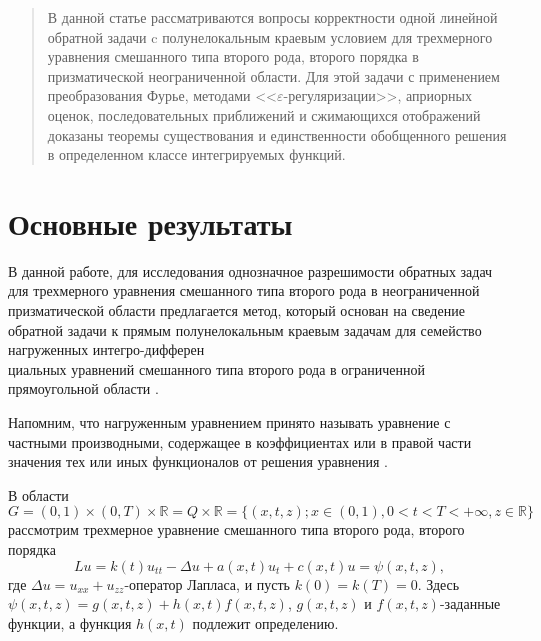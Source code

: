 \maketitle

\begin{abstract}
В данной статье рассматриваются вопросы корректности одной линейной обратной задачи c полунелокальным краевым условием для трехмерного уравнения смешанного типа второго рода, второго порядка в призматической неограниченной области. Для этой задачи с применением преобразования Фурье, методами <<$\varepsilon$-ре\-гу\-ля\-ри\-за\-ции>>, априорных оценок, последовательных приближений и сжимающихся отображений доказаны теоремы существования и единственности обобщенного решения в определенном классе интегрируемых функций.

\end{abstract}

\section{Основные результаты} %

В данной работе, для исследования однозначное разрешимости обратных задач для трехмерного уравнения смешанного типа второго рода в неограниченной призматической области предлагается метод, который основан на сведение обратной задачи к прямым полунелокальным краевым задачам для  семейство нагруженных интегро-дифферен \\циальных уравнений смешанного типа второго рода в ограниченной прямоугольной области \cite{Dzhamalov1,Dzhamalov2,Dzhamalov3}.

Напомним, что нагруженным уравнением принято называть уравнение с частными производными, содержащее в коэффициентах или в правой части значения тех или иных функционалов от решения уравнения \cite{Nakhushev}.

В области
$$G=(0,1)\times (0,T)\times \mathbb{R}=Q\times \mathbb{R}=\{(x,t,z);x\in (0,1),0<t<T<+\infty , z\in \mathbb{R}\}$$
рассмотрим трехмерное уравнение смешанного типа второго рода, второго порядка
 \begin{equation}\label{1}
Lu=k(t)u_{tt}-\Delta u +a(x,t)u_{t}+ c(x,t)u=\psi (x,t,z),
 \end{equation}
где $\Delta u=u_{xx}+u_{zz}$-оператор Лапласа, и пусть  $k(0)=k(T)=0$. Здесь $\psi (x,t,z)=g(x,t,z)+h(x,t)f(x,t,z)$,  $g(x,t,z)$ и $f(x,t,z)$-заданные функции, а функция  $h(x,t)$ подлежит определению.

